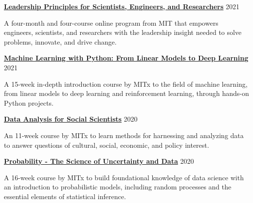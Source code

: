 \documentclass[margin,line]{res}
\begin{document}
\begin{resume}
\vspace*{-3mm}

{\bf \href{https://xpro.mit.edu/programs/program-v1:xPRO+LASERx/}{Leadership Principles for Scientists, Engineers, and Researchers}} \hfill {2021}\\
\vspace*{-3.5mm}
\begin{addmargin}[0pt]{.1\linewidth}
\vspace*{-1mm}
A four-month and four-course online program from MIT that empowers engineers, scientists, and researchers with the leadership insight needed to solve problems, innovate, and drive change.
\end{addmargin}

\vspace*{-3mm}

{\bf \href{https://www.edx.org/course/machine-learning-with-python-from-linear-models-to}{Machine Learning with Python: From Linear Models to Deep Learning}} \hfill {2021}\\
\vspace*{-3.5mm}
\begin{addmargin}[0pt]{.1\linewidth}
\vspace*{-1mm}
A 15-week in-depth introduction course by MITx to the field of machine learning, from linear models to deep learning and reinforcement learning, through hands-on Python projects.
\end{addmargin}

\vspace*{-3mm}

{\bf \href{https://mitxonline.mit.edu/courses/course-v1:MITxT+14.310x/}{Data Analysis for Social Scientists}} \hfill {2020}\\
\vspace*{-3.5mm}
\begin{addmargin}[0pt]{.1\linewidth}
\vspace*{-1mm}
An 11-week course by MITx to learn methods for harnessing and analyzing data to answer questions of cultural, social, economic, and policy interest.
\end{addmargin}

\vspace*{-3mm}

{\bf \href{https://www.edx.org/course/probability-the-science-of-uncertainty-and-data}{Probability - The Science of Uncertainty and Data}} \hfill {2020}\\
\vspace*{-3.5mm}
\begin{addmargin}[0pt]{.1\linewidth}
\vspace*{-1mm}
A 16-week course by MITx to build foundational knowledge of data science with an introduction to probabilistic models, including random processes and the essential elements of statistical inference.
\end{addmargin}


\end{resume}
\end{document}
